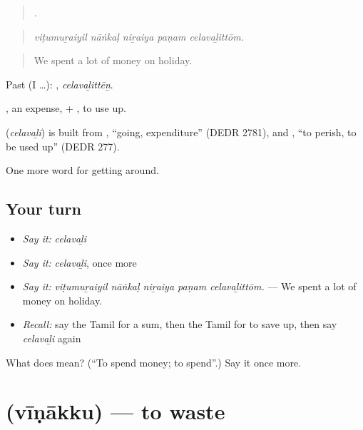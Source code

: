 \begin{quote}
    .
\end{quote}

\begin{quote}
\emph{viṭumuṟaiyil nāṅkaḷ niṟaiya paṇam celavaḻittōm.}
\end{quote}

\begin{quote}
We spent a lot of money on holiday.
\end{quote}

Past (I …): , \emph{celavaḻittēṉ}.

, an expense, + , to use up.

\begin{cousinweb}
\textbf{} (\emph{celavaḻi}) is built from , \textquotedblleft{}going, expenditure\textquotedblright{} (DEDR 2781), and , \textquotedblleft{}to perish, to be used up\textquotedblright{} (DEDR 277).
\end{cousinweb}

\begin{grammarlens}[title={What you've built}]
One more word for getting around.
\end{grammarlens}

\subsection*{Your turn}
\begin{itemize}
\raggedright
  \item \emph{Say it:} \emph{celavaḻi}
  \item \emph{Say it:} \emph{celavaḻi}, once more
  \item \emph{Say it:} \emph{viṭumuṟaiyil nāṅkaḷ niṟaiya paṇam celavaḻittōm.} — We spent a lot of money on holiday.
  \item \emph{Recall:} say the Tamil for a sum, then the Tamil for to save up, then say \emph{celavaḻi} again
\end{itemize}

\begin{tcolorbox}[breakable,colback=teal!4,colframe=teal!35!black,title={Before you move on}]
What does  mean? (\textquotedblleft{}To spend money; to spend\textquotedblright{}.) Say it once more.
\end{tcolorbox}
\section[\texorpdfstring{\ta{வீணாக்கு} (vīṇākku)}{வீணாக்கு (vīṇākku)}]{ (vīṇākku) — to waste}

